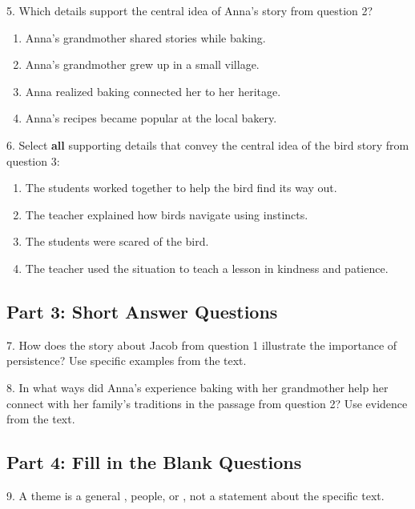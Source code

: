 \documentclass[12pt]{article}
\begin{document}
\vspace{1cm}

5. Which details support the central idea of Anna’s story from question 2?  
\begin{enumerate}[label=\Alph*.]
    \item Anna’s grandmother shared stories while baking.  
    \item Anna’s grandmother grew up in a small village.  
    \item Anna realized baking connected her to her heritage.  
    \item Anna’s recipes became popular at the local bakery.  
\end{enumerate}

\vspace{1cm}

6. Select \textbf{all} supporting details that convey the central idea of the bird story from question 3:  
\begin{enumerate}[label=\Alph*.]
    \item The students worked together to help the bird find its way out.  
    \item The teacher explained how birds navigate using instincts.  
    \item The students were scared of the bird.  
    \item The teacher used the situation to teach a lesson in kindness and patience.  
\end{enumerate}

\vspace{1cm}
\newpage
\subsection*{Part 3: Short Answer Questions}

7. How does the story about Jacob from question 1 illustrate the importance of persistence? Use specific examples from the text.  
\vspace{4cm}

8. In what ways did Anna’s experience baking with her grandmother help her connect with her family’s traditions in the passage from question 2? Use evidence from the text.  
\vspace{4cm}

\subsection*{Part 4: Fill in the Blank Questions}
\vspace{1cm}
9. A theme is a general \underline{\hspace{4cm}} , people, or \underline{\hspace{4cm}} , not a statement about the specific text.
\vspace{2cm}
\end{document}
